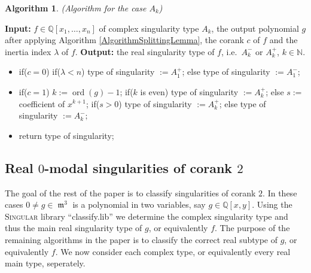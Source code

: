 \documentclass{amsproc}
\DeclareMathOperator{\ord}{ord}
\DeclareMathOperator{\m}{\mathfrak{m}}
\begin{document}
\newtheorem{A[k]}[kjet]{Algorithm}
\begin{A[k]}(Algorithm for the case $A_k$)
\end{A[k]}
\noindent\textnormal{\bf Input:} $f\in \mathbb Q[x_1,\ldots,x_n]$ of
complex singularity type $A_k$, the output polynomial $g$ after
applying Algorithm \ref{AlgorithmSplittingLemma}, the corank $c$ of $f$
and the inertia index $\lambda$ of $f$.\newline
\textnormal{\bf Output:} the real singularity type of $f$, i.e.~$A_k^-$
or $A_k^+$, $k\in\mathbb N$.
\begin{itemize}
\item if($c=0$)\newline
\phantom{}\quad if($\lambda<n$)\newline
\phantom{}\quad\quad type of singularity $:=A_1^+$;\newline
\phantom{}\quad else\newline
\phantom{}\quad\quad type of singularity $:=A_1^-$;
\item if($c=1$)\newline
\phantom{}\quad $k:= \ord(g)-1$;\newline
\phantom{}\quad if($k$ is even)\newline
\phantom{}\quad\quad type of singularity $:= A_k^+$;\newline
\phantom{}\quad else\newline
\phantom{}\quad\quad $s:=$ coefficient of $x^{k+1}$;\newline
\phantom{}\quad\quad if($s>0$)\newline
\phantom{}\quad\quad\quad type of singularity $:= A_k^+$;\newline
\phantom{}\quad\quad else\newline
\phantom{}\quad\quad\quad type of singularity $:= A_k^-;$
\item return type of singularity;
\end{itemize}

\subsection{Real $0$-modal singularities of corank $2$}

The goal of the rest of the paper is to classify singularities of corank $2$. In these cases $0\neq g\in\m^3$ is a polynomial in two variables, say $g\in\mathbb Q[x,y]$. Using the \textsc{Singular} library ``classify.lib'' we determine the complex singularity type and thus the main real singularity type of $g$, or equivalently $f$. The purpose of the remaining algorithms in the paper is to classify the correct real subtype of $g$, or equivalently $f$. We now consider each complex type, or equivalently every real main type, seperately.
\end{document}
